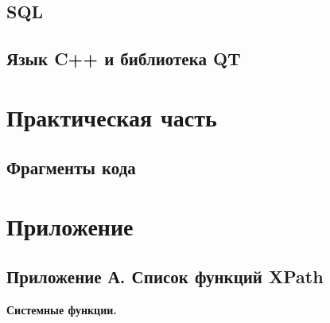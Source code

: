 \documentclass[12pt,a4paper,oneside]{article} %
\begin{document}
\newpage
\subsection{SQL}

\newpage
\subsection{Язык C++ и библиотека QT}

\newpage
\section{Практическая часть}
\subsection{Фрагменты кода}



\newpage
\section{Приложение}
\subsection{Приложение А. Список функций XPath}

\textbf{Системные функции.}
\end{document}
